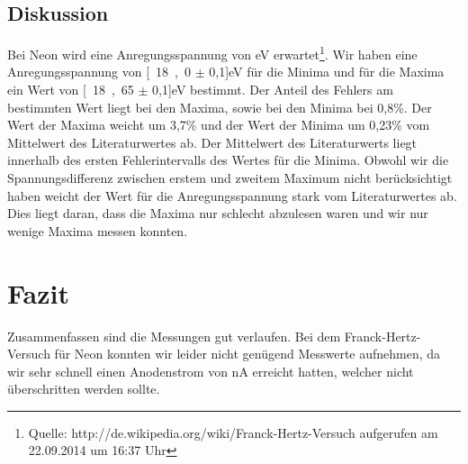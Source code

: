 \documentclass[12pt,a4paper]{article}
\begin{document}
\subsection{Diskussion}

Bei Neon wird eine Anregungsspannung von \unit[18,4 bis 19,0]{eV} erwartet\footnote{Quelle: http://de.wikipedia.org/wiki/Franck-Hertz-Versuch aufgerufen am 22.09.2014 um 16:37 Uhr}. Wir haben eine Anregungsspannung von \unit[18,0 $\pm$ 0,1]{eV} für die Minima und für die Maxima ein Wert von \unit[18,65 $\pm$ 0,1]{eV} bestimmt. Der Anteil des Fehlers am bestimmten Wert liegt bei den Maxima, sowie bei den Minima bei 0,8\%. Der Wert der Maxima weicht um 3,7\% und der Wert der Minima um 0,23\% vom Mittelwert des Literaturwertes ab. Der Mittelwert des Literaturwerts liegt innerhalb des ersten Fehlerintervalls des Wertes für die Minima. Obwohl wir die Spannungsdifferenz zwischen erstem und zweitem Maximum nicht berücksichtigt haben weicht der Wert für die Anregungsspannung stark vom Literaturwertes ab. Dies liegt daran, dass die Maxima nur schlecht abzulesen waren und wir nur wenige Maxima messen konnten.

\section{Fazit}
Zusammenfassen sind die Messungen gut verlaufen. Bei dem Franck-Hertz-Versuch für Neon konnten wir leider nicht genügend Messwerte aufnehmen, da wir sehr schnell einen Anodenstrom von \unit[10]{nA} erreicht hatten, welcher nicht überschritten werden sollte.
\end{document}
